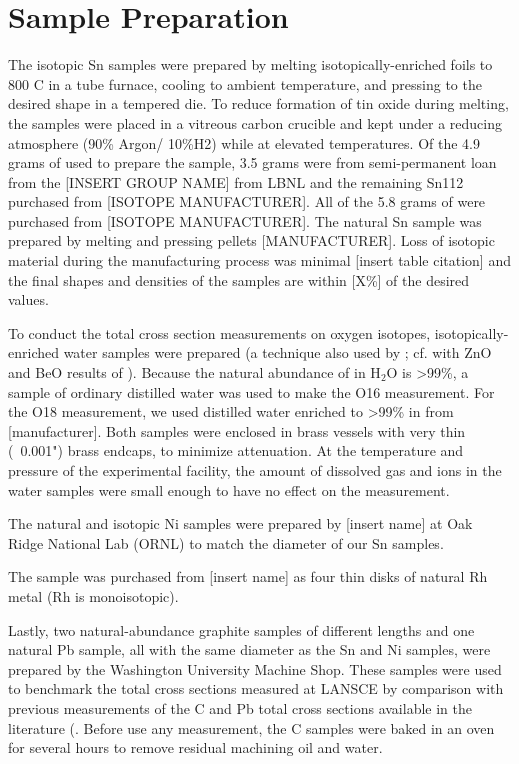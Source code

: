 \section{Sample Preparation}

The isotopic Sn samples were prepared by melting isotopically-enriched foils to
800 C in a tube furnace, cooling to ambient temperature, and pressing to the
desired shape in a tempered die. To reduce formation of tin
oxide during melting, the samples were placed in a vitreous carbon crucible
and kept under a reducing atmosphere (90\% Argon/ 10\%H2) while at elevated
temperatures. Of the 4.9 grams of \snTwelve used to prepare the sample,
3.5 grams were from
semi-permanent loan from the [INSERT GROUP NAME] from LBNL and the remaining
Sn112 purchased from [ISOTOPE MANUFACTURER]. All of the 5.8 grams of \snFour were purchased from
[ISOTOPE MANUFACTURER]. The natural Sn sample was prepared by melting and
pressing pellets [MANUFACTURER]. Loss of isotopic material during the
manufacturing process was minimal [insert table citation] and the final 
shapes and densities of the samples are within [X\%] of the desired values.

To conduct the total cross section measurements on oxygen isotopes,
isotopically-enriched water samples were prepared (a technique also used by
\cite{Vaughn1965, Salisbury1965}; cf.  with ZnO and BeO results of \cite{Finlay1993}).
Because the natural abundance of \oSix in H$_{2}$O is >99\%, a sample of
ordinary distilled water was used to make the O16 measurement. For the O18
measurement, we used distilled water enriched to >99\% in \oEight from
[manufacturer]. Both samples were enclosed in brass vessels with very thin
(~0.001") brass endcaps, to minimize attenuation. At the temperature and
pressure of the experimental facility, the amount of dissolved gas and ions
in the water samples were small enough to have no effect on the measurement.

The natural and isotopic Ni samples were prepared by [insert name] at Oak Ridge National Lab 
(ORNL) to match the diameter of our Sn samples.

The \rhThree sample was purchased from [insert name] as four thin disks of natural Rh metal (Rh is
monoisotopic).

Lastly, two natural-abundance graphite samples of different lengths and one
natural Pb sample, all with the same diameter as the Sn and Ni samples, were
prepared by the Washington University Machine Shop. These
samples were used to benchmark the total cross sections measured at LANSCE by
comparison with previous measurements of the C and Pb total cross sections
available in the literature (\cite{Finlay1993,Abfalterer2001}. Before use any
measurement, the C samples were baked in an oven for several
hours to remove residual machining oil and water.

